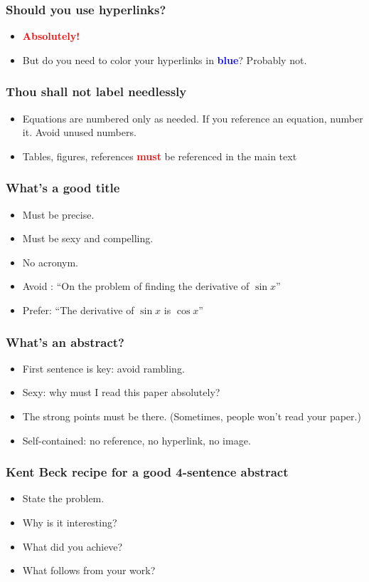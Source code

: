 \documentclass[handout]{beamer}
\newcommand{\vimportant}[1]{\textcolor{red}{\textbf{#1}}}
\newcommand{\important}[1]{\textcolor{blue}{\textbf{#1}}}
\begin{document}
\frame
{
  \frametitle{Should you use hyperlinks?}

   \begin{itemize}
  \item<1->  \vimportant{Absolutely! }
  \item<2-> But do you need to color your hyperlinks in \important{blue}? Probably not.
  \end{itemize}
}
\frame
{
  \frametitle{Thou shall not label needlessly}

    \begin{itemize}
  \item<1-> Equations are numbered only as needed. If you reference an equation, number it. Avoid unused numbers.
   \item<2-> Tables, figures, references \vimportant{\LARGE must} be referenced in the main text
    \end{itemize}

}


\frame
{
  \frametitle{What's a good title}

 \begin{itemize}
  \item<1->   Must be precise.
  \item<2-> Must be sexy and compelling.
  \item<3-> No acronym.
  \item<4-> Avoid : ``On the problem of finding the derivative of $\sin x$''
    \item<5-> Prefer: ``The derivative of $\sin x$ is $\cos x$''
\end{itemize}

}

\frame
{
  \frametitle{What's an abstract?}
     \begin{itemize}
  \item<1-> First sentence is key: avoid rambling.
  \item<2-> Sexy: why must I read this paper absolutely?
  \item<3-> The strong points must be there. (Sometimes, people won't read your paper.)
  \item<4-> Self-contained: no reference, no hyperlink, no image.
      \end{itemize}
 }

\frame
{
  \frametitle{Kent Beck recipe for a good 4-sentence abstract}
     \begin{itemize}
  \item<1-> State the problem.
  \item<2-> Why is it interesting?
  \item<3-> What did you achieve?
  \item<4-> What follows from your work?
      \end{itemize}
 }
\end{document}
